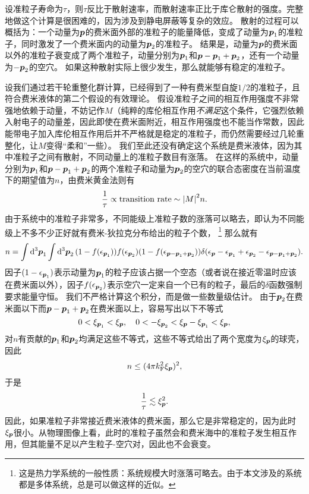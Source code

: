 设准粒子寿命为$\tau$，则$\tau$反比于散射速率，而散射速率正比于库仑散射的强度。完整地做这个计算是很困难的，因为涉及到静电屏蔽等复杂的效应。
散射的过程可以概括为：一个动量为$\vb*{p}$的费米面外部的准粒子的能量降低，变成了动量为$\vb*{p}_1$的准粒子，同时激发了一个费米面内的动量为$\vb*{p}_2$的准粒子。
结果是，动量为$\vb*{p}$的费米面以外的准粒子衰变成了两个准粒子，动量分别为$\vb*{p}_1$和$\vb*{p} - \vb*{p}_1 + \vb*{p}_2$，还有一个动量为$-\vb*{p}_2$的空穴。
如果这种散射实际上很少发生，那么就能够有稳定的准粒子。

设我们通过若干轮重整化群计算，已经得到了一种有费米型自旋$1/2$的准粒子，且符合费米液体的第二个假设的有效理论。
假设准粒子之间的相互作用强度不非常强地依赖于动量，不妨记作$M$（纯粹的库伦相互作用\emph{不满足}这个条件，它强烈依赖入射电子的动量差，因此即使在费米面附近，相互作用强度也不能当作常数，因此能带电子加入库伦相互作用后并不严格就是稳定的准粒子，而仍然需要经过几轮重整化，让$M$变得“柔和”一些）。
我们至此还没有确定这个系统是费米液体，因为其中准粒子之间有散射，不同动量上的准粒子数目有涨落。
在这样的系统中，动量分别为$\vb*{p}_1$和$\vb*{p} - \vb*{p}_1 + \vb*{p}_2$的两个准粒子和动量为$\vb*{p}_2$的空穴的联合态密度在当前温度下的期望值为$n$，由费米黄金法则有
\[
    \frac{1}{\tau} \propto \text{transition rate} \sim \abs{M}^2 n.
\]
由于系统中的准粒子非常多，不同能级上准粒子数的涨落可以略去，即认为不同能级上不多不少正好就有费米-狄拉克分布给出的粒子个数，%
\footnote{这是热力学系统的一般性质：系统规模大时涨落可略去。由于本文涉及的系统都是多体系统，总是可以做这样的近似。}%
那么就有
\[
    n = \int \dd[3]{\vb*{p}_1} \int \dd[3]{\vb*{p}_2} (1 - f(\epsilon_{\vb*{p}_1})) f(\epsilon_{\vb*{p}_2}) (1 - f(\epsilon_{\vb*{p} - \vb*{p}_1 + \vb*{p}_2})) \delta(\epsilon_{\vb*{p}} - \epsilon_{\vb*{p}_1} + \epsilon_{\vb*{p}_2} - \epsilon_{\vb*{p} - \vb*{p}_1 + \vb*{p}_2}).
\]
因子$(1-\epsilon_{\vb*{p}_1})$表示动量为$\vb*{p}_1$的粒子应该占据一个空态（或者说在接近零温时应该在费米面以外），因子$f(\epsilon_{\vb*{p}_2})$表示空穴一定来自一个已有的粒子，最后的$\delta$函数强制要求能量守恒。
我们不严格计算这个积分，而是做一些数量级估计。
由于$\vb*{p}_2$在费米面以下而$\vb*{p}- \vb*{p}_1 + \vb*{p}_2$在费米面以上，容易写出以下不等式
\[
    0 < \xi_{\vb*{p}_1} < \xi_{\vb*{p}}, \quad 0 < - \xi_{\vb*{p}_2} < \xi_{\vb*{p}} - \xi_{\vb*{p}_1} < \xi_{\vb*{p}},
\]
对$n$有贡献的$\vb*{p}_1$和$\vb*{p}_2$均满足这些不等式，这些不等式给出了两个宽度为$\xi_{\vb*{p}}$的球壳，因此
\[
    n \leq (4 \pi k_\text{F}^2 \xi_{\vb*{p}})^2,
\]
于是
\begin{equation}
    \frac{1}{\tau} \lesssim \xi_{\vb*{p}}^2.
\end{equation}
因此，如果准粒子非常接近费米液体的费米面，那么它是非常稳定的，因为此时$\xi_{\vb*{p}}$很小。从物理图像上看，此时的准粒子虽然会和费米海中的准粒子发生相互作用，但其能量不足以产生粒子-空穴对，因此也不会衰变。

